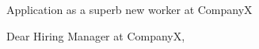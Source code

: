 
\opening{		
	\large{Application as a superb new worker at CompanyX} \normalsize 
}


\makelettertitle\justifying
Dear Hiring Manager at CompanyX,